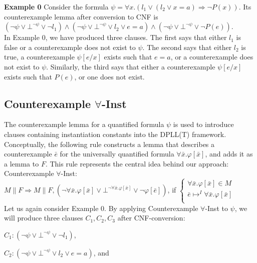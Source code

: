 \documentclass{llncs}
\begin{document}
{\bf Example 0}
Consider the formula $\psi = \forall x. ( l_1 \vee ( l_2 \vee x = a ) \Rightarrow \neg P( x ) )$.
Its counterexample lemma after conversion to CNF is $( \neg \psi \vee \bot^{\neg \psi} \vee \neg l_1 ) \wedge ( \neg \psi \vee \bot^{\neg \psi} \vee l_2 \vee e = a ) \wedge ( \neg \psi \vee \bot^{\neg \psi} \vee \neg P( e ) ) $. \\

In Example 0, we have produced three clauses.
The first says that either $l_1$ is false or a counterexample does not exist to $\psi$.
The second says that either $l_2$ is true, a counterexample $\psi[e/x]$ exists such that $e = a$, or a counterexample does not exist to $\psi$. 
Similarly, the third says that either a counterexample $\psi[e/x]$ exists such that $P( e )$, or one does not exist.

\subsection{Counterexample $\forall$-Inst}

The counterexample lemma for a quantified formula $\psi$ is used to introduce clauses containing instantiation constants into the DPLL(T) framework.
Conceptually, the following rule constructs a lemma that describes a counterexample $\bar{e}$ for the universally quantified formula $\forall \bar{x}. \varphi[ \bar{ x } ]$, and adds it as a lemma to $F$.
This rule represents the central idea behind our approach: \\

\noindent Counterexample $\forall$-Inst: \\

$M \parallel F \Longrightarrow M \parallel F, (\neg \forall \bar{x}. \varphi[ \bar{x} ] \vee \bot^{\neg \forall \bar{x}. \varphi[ \bar{x} ]} \vee \neg \varphi[ \bar{ e } ])$, if   
$\begin{cases}
  \forall \bar{x}. \varphi[ \bar{ x } ] \in M \\
  \bar{ e } \mapsto^I \forall \bar{x}. \varphi[ \bar{ x } ] \\
\end{cases}$ \\

Let us again consider Example 0.
By applying Counterexample $\forall$-Inst to $\psi$, we will produce three clauses $C_1, C_2, C_3$ after CNF-conversion:

$C_1 : ( \neg \psi \vee \bot^{\neg \psi} \vee \neg l_1 )$,

$C_2 : ( \neg \psi \vee \bot^{\neg \psi} \vee l_2 \vee e = a )$, and
\end{document}
